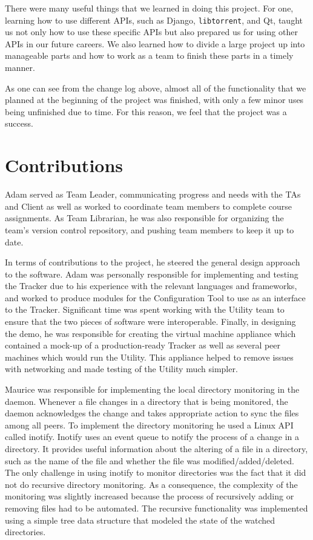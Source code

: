 \documentclass[12 pt]{article}
\begin{document}
	There were many useful things that we learned in doing this project. For one, learning how to use different APIs, such as Django, \texttt{libtorrent}, and Qt, taught us not only how to use these specific APIs but also prepared us for using other APIs in our future careers. We also learned how to divide a large project up into manageable parts and how to work as a team to finish these parts in a timely manner.
	
	As one can see from the change log above, almost all of the functionality that we planned at the beginning of the project was finished, with only a few minor uses being unfinished due to time. For this reason, we feel that the project was a success.
	
	\section{Contributions}
	Adam served as Team Leader, communicating progress and needs with the TAs and Client as well as worked to coordinate team members to complete course assignments. As Team Librarian, he was also responsible for organizing the team's version control repository, and pushing team members to keep it up to date.
	
	In terms of contributions to the project, he steered the general design approach to the software. Adam was personally responsible for implementing and testing the Tracker due to his experience with the relevant languages and frameworks, and worked to produce modules for the Configuration Tool to use as an interface to the Tracker. Significant time was spent working with the Utility team to ensure that the two pieces of software were interoperable. Finally, in designing the demo, he was responsible for creating the virtual machine appliance which contained a mock-up of a production-ready Tracker as well as several peer machines which would run the Utility. This appliance helped to remove issues with networking and made testing of the Utility much simpler.
	
	Maurice was responsible for implementing the local directory monitoring in the daemon. Whenever a file changes in a directory that is being monitored, the daemon acknowledges the change and takes appropriate action to sync the files among all peers. To implement the directory monitoring he used a Linux API called inotify. Inotify uses an event queue to notify the process of a change in a directory. It provides useful information about the altering of a file in a directory, such as the name of the file and whether the file was modified/added/deleted. The only challenge in using inotify to monitor directories was the fact that it did not do recursive directory monitoring. As a consequence, the complexity of the monitoring was slightly increased because the process of recursively adding or removing files had to be automated. The recursive functionality was implemented using a simple tree data structure that modeled the state of the watched directories.
	
\end{document}

